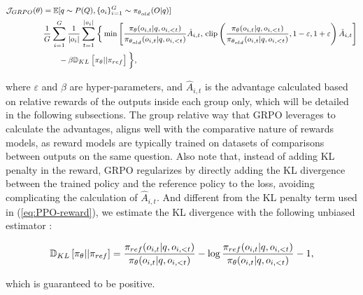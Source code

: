 \begin{itemize}[topsep=0pt]
\begin{itemize}[topsep=0pt]
\begin{equation}
\footnotesize
\begin{split}
    \mathcal{J}_{GRPO}(\theta) &= \mathbb{E}{[q \sim P(Q), \{o_i\}_{i=1}^G \sim \pi_{\theta_{old}}(O|q)]}  \\
    & \frac{1}{G}\sum_{i=1}^G\frac{1}{|o_i|} \sum_{t=1}^{|o_i|} \bigg\{ \min \left[ \frac{\pi_\theta(o_{i,t} | q, o_{i,<t})}{\pi_{\theta_{old}}(o_{i,t} | q, o_{i,<t})} \hat{A}_{i,t},\, \text{clip} \left( \frac{\pi_\theta(o_{i,t} | q, o_{i,<t})}{\pi_{\theta_{old}}(o_{i,t} | q, o_{i,<t})}, 1 - \varepsilon, 1 + \varepsilon \right) \hat{A}_{i,t} \right] \\
    & \qquad - \beta \mathbb{D}_{KL}\left[\pi_{\theta} || \pi_{ref}\right] \bigg\},
\end{split}
\label{eq:GRPO-obj}
\end{equation}

where $\varepsilon$ and $\beta$ are hyper-parameters, and $\hat{A}_{i,t}$  is the advantage calculated based on relative rewards of the outputs inside each group only, which will be detailed in the following subsections. The group relative way that GRPO leverages to calculate the advantages, aligns well with the comparative nature of rewards models,  as reward models are typically trained on datasets of comparisons between outputs on the same question. Also note that, instead of adding KL penalty in the reward, GRPO regularizes by directly adding the KL divergence between the trained policy and the reference policy to the loss, avoiding complicating the calculation of  $\hat{A}_{i,t}$. And different from the KL penalty term used in (\ref{eq:PPO-reward}), we estimate the KL divergence with the following unbiased estimator \citep{kl_approx}:

\begin{equation}
\small
    \mathbb{D}_{KL}\left[\pi_{\theta} || \pi_{ref}\right] = \frac{\pi_{ref}(o_{i,t}|q,o_{i,<t})}{\pi_{\theta}(o_{i,t}|q,o_{i,<t})}- \log\frac{\pi_{ref}(o_{i,t}|q,o_{i,<t})}{\pi_{\theta}(o_{i,t}|q,o_{i,<t})} - 1,
\end{equation}

which is guaranteed to be positive.


\end{itemize}
\end{itemize}
